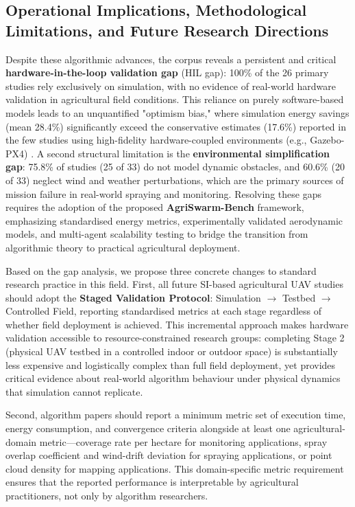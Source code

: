 \documentclass[review,3p,times]{elsarticle}
\begin{document}
\subsection{Operational Implications, Methodological Limitations, and Future Research Directions}

Despite these algorithmic advances, the corpus reveals a persistent and critical \textbf{hardware-in-the-loop validation gap} (HIL gap): 100\% of the 26 primary studies rely exclusively on simulation, with no evidence of real-world hardware validation in agricultural field conditions. This reliance on purely software-based models leads to an unquantified "optimism bias," where simulation energy savings (mean 28.4\%) significantly exceed the conservative estimates (17.6\%) reported in the few studies using high-fidelity hardware-coupled environments (e.g., Gazebo-PX4) \cite{li2023,rao2024}. A second structural limitation is the \textbf{environmental simplification gap}: 75.8\% of studies (25 of 33) do not model dynamic obstacles, and 60.6\% (20 of 33) neglect wind and weather perturbations, which are the primary sources of mission failure in real-world spraying and monitoring. Resolving these gaps requires the adoption of the proposed \textbf{AgriSwarm-Bench} framework, emphasizing standardised energy metrics, experimentally validated aerodynamic models, and multi-agent scalability testing to bridge the transition from algorithmic theory to practical agricultural deployment.

Based on the gap analysis, we propose three concrete changes to standard research practice in this field. First, all future SI-based agricultural UAV studies should adopt the \textbf{Staged Validation Protocol}: Simulation $\rightarrow$ Testbed $\rightarrow$ Controlled Field, reporting standardised metrics at each stage regardless of whether field deployment is achieved. This incremental approach makes hardware validation accessible to resource-constrained research groups: completing Stage 2 (physical UAV testbed in a controlled indoor or outdoor space) is substantially less expensive and logistically complex than full field deployment, yet provides critical evidence about real-world algorithm behaviour under physical dynamics that simulation cannot replicate.

Second, algorithm papers should report a minimum metric set of execution time, energy consumption, and convergence criteria alongside at least one agricultural-domain metric---coverage rate per hectare for monitoring applications, spray overlap coefficient and wind-drift deviation for spraying applications, or point cloud density for mapping applications. This domain-specific metric requirement ensures that the reported performance is interpretable by agricultural practitioners, not only by algorithm researchers.
\end{document}
